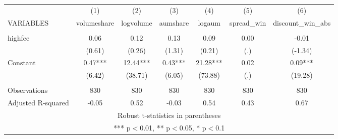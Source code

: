 \documentclass[]{article}
\begin{document}
\begin{tabular}{lcccccc} \hline
 & (1) & (2) & (3) & (4) & (5) & (6) \\
VARIABLES & volumeshare & logvolume & aumshare & logaum & spread\_win & discount\_win\_abs \\ \hline
 &  &  &  &  &  &  \\
highfee & 0.06 & 0.12 & 0.13 & 0.09 & 0.00 & -0.01 \\
 & (0.61) & (0.26) & (1.31) & (0.21) & (.) & (-1.34) \\
Constant & 0.47*** & 12.44*** & 0.43*** & 21.28*** & 0.02 & 0.09*** \\
 & (6.42) & (38.71) & (6.05) & (73.88) & (.) & (19.28) \\
 &  &  &  &  &  &  \\
Observations & 830 & 830 & 830 & 830 & 830 & 830 \\
 Adjusted R-squared & -0.05 & 0.52 & -0.03 & 0.54 & 0.43 & 0.67 \\ \hline
\multicolumn{7}{c}{ Robust t-statistics in parentheses} \\
\multicolumn{7}{c}{ *** p$<$0.01, ** p$<$0.05, * p$<$0.1} \\
\end{tabular}
\end{document}
